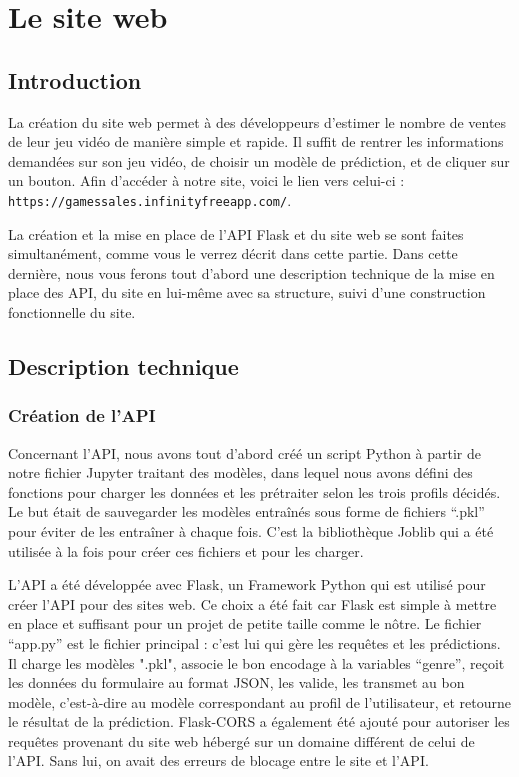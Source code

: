 \documentclass[mstat,12pt]{unswthesis}
\begin{document}

\hypertarget{LeSiteWeb}{%
\chapter{\textbf{Le site web}}\label{LeSiteWeb}}

\hypertarget{introSiteWeb}{%
\section{\textbf{Introduction}}\label{introSiteWeb}}

La création du site web permet à des développeurs d’estimer le nombre de ventes de leur jeu vidéo de manière simple et rapide. Il suffit de rentrer les informations demandées sur son jeu vidéo, de choisir un modèle de prédiction, et de cliquer sur un bouton. Afin d’accéder à notre site, voici le lien vers celui-ci : \texttt{https://gamessales.infinityfreeapp.com/}.

La création et la mise en place de l'API Flask et du site web se sont faites simultanément, comme vous le verrez décrit dans cette partie. Dans cette dernière, nous vous ferons tout d’abord une description technique de la mise en place des API, du site en lui-même avec sa structure, suivi d’une construction fonctionnelle du site.


\hypertarget{DescriptionTechnique}{%
\section{\textbf{Description technique}}\label{DescriptionTechnique}}

\subsection{\textbf{Création de l'API}}

Concernant l'API, nous avons tout d'abord créé un script Python à partir de notre fichier Jupyter traitant des modèles, dans lequel nous avons défini des fonctions pour charger les données et les prétraiter selon les trois profils décidés. Le but était de sauvegarder les modèles entraînés sous forme de fichiers “.pkl” pour éviter de les entraîner à chaque fois. C’est la bibliothèque Joblib qui a été utilisée à la fois pour créer ces fichiers et pour les charger.

L'API a été développée avec Flask, un Framework Python qui est utilisé pour créer l’API pour des sites web. Ce choix a été fait car Flask est simple à mettre en place et suffisant pour un projet de petite taille comme le nôtre. Le fichier “app.py” est le fichier principal : c’est lui qui gère les requêtes et les prédictions. Il charge les modèles ".pkl", associe le bon encodage à la variables “genre”, reçoit les données du formulaire au format JSON, les valide, les transmet au bon modèle, c’est-à-dire au modèle correspondant au profil de l'utilisateur, et retourne le résultat de la prédiction. Flask-CORS a également été ajouté pour autoriser les requêtes provenant du site web hébergé sur un domaine différent de celui de l'API. Sans lui, on avait des erreurs de blocage entre le site et l’API.
\end{document}
